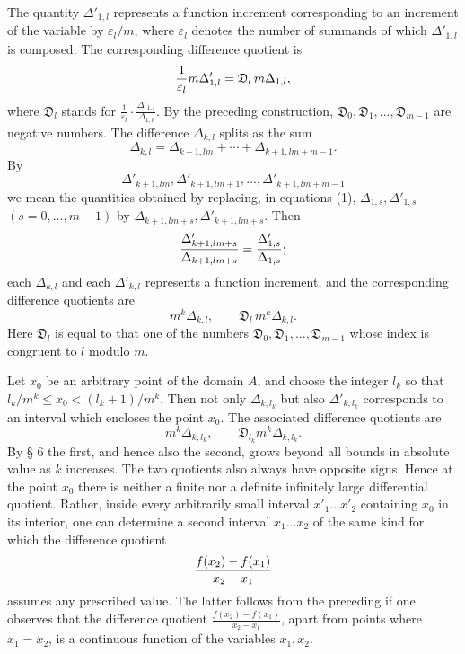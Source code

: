 \documentclass[11pt,a4paper]{article}
\begin{document}
The quantity $\Delta'_{1,l}$ represents a function increment corresponding to an increment of the variable by $\varepsilon_l/m$, where $\varepsilon_l$ denotes the number of summands of which $\Delta'_{1,l}$ is composed. The corresponding difference quotient is
\[
 {1\over\varepsilon_l}m\Delta'_{1,l}=\mathfrak D_l\,m\Delta_{1,l},
\]
where $\mathfrak D_l$ stands for $\frac1{\varepsilon_l}\cdot\frac{\Delta'_{1,l}}{\Delta_{1,l}}$. By the preceding construction, $\mathfrak D_0,\mathfrak D_1,\ldots,\mathfrak D_{m-1}$ are negative numbers. The difference $\Delta_{k,l}$ splits as the sum
\[
 \Delta_{k,l}=\Delta_{k+1,lm}+\cdots+\Delta_{k+1,lm+m-1}.
\]
By
\[
 \Delta'_{k+1,lm},\Delta'_{k+1,lm+1},\ldots,\Delta'_{k+1,lm+m-1}
\]
we mean the quantities obtained by replacing, in equations (1), $\Delta_{1,s},\Delta'_{1,s}$ $(s=0,
\ldots,m-1)$ by $\Delta_{k+1,lm+s},\Delta'_{k+1,lm+s}$. Then
\[
 {\Delta'_{k+1,lm+s}\over\Delta_{k+1,lm+s}}={\Delta'_{1,s}\over\Delta_{1,s}};
\]
each $\Delta_{k,l}$ and each $\Delta'_{k,l}$ represents a function increment, and the corresponding difference quotients are
\[
 m^k\Delta_{k,l},
 \qquad
 \mathfrak D_l\,m^k\Delta_{k,l}.
\]
Here $\mathfrak D_l$ is equal to that one of the numbers $\mathfrak D_0,\mathfrak D_1,\ldots,\mathfrak D_{m-1}$ whose index is congruent to $l$ modulo $m$.

Let $x_0$ be an arbitrary point of the domain $A$, and choose the integer $l_k$ so that $l_k/m^k\le x_0<(l_k+1)/m^k$. Then not only $\Delta_{k,l_k}$ but also $\Delta'_{k,l_k}$ corresponds to an interval which encloses the point $x_0$. The associated difference quotients are
\[
 m^k\Delta_{k,l_k},
 \qquad
 \mathfrak D_{l_k}m^k\Delta_{k,l_k}.
\]
By § 6 the first, and hence also the second, grows beyond all bounds in absolute value as $k$ increases. The two quotients also always have opposite signs. Hence at the point $x_0$ there is neither a finite nor a definite infinitely large differential quotient. Rather, inside every arbitrarily small interval $x'_1\ldots x'_2$ containing $x_0$ in its interior, one can determine a second interval $x_1\ldots x_2$ of the same kind for which the difference quotient
\[
 {f(x_2)-f(x_1)\over x_2-x_1}
\]
assumes any prescribed value. The latter follows from the preceding if one observes that the difference quotient $\frac{f(x_2)-f(x_1)}{x_2-x_1}$, apart from points where $x_1=x_2$, is a continuous function of the variables $x_1,x_2$.
\end{document}
